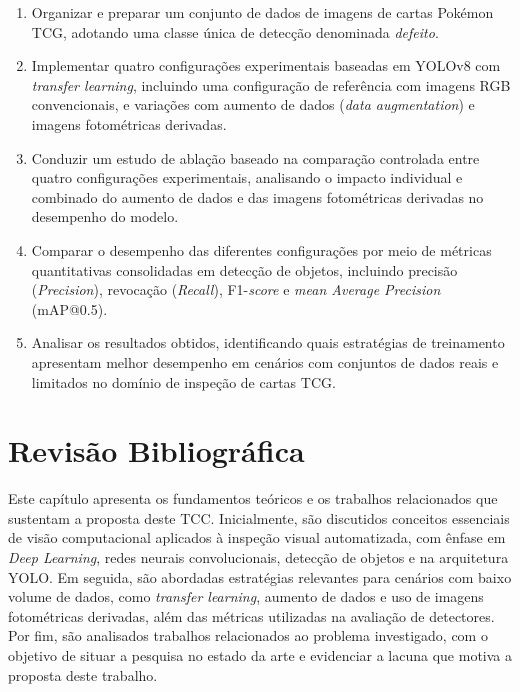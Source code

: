 \documentclass[
    12pt,                %
    openright,           %
    oneside,             %
    a4paper,             %
    english,             %
    brazil               %
]{abntex2}
\begin{document}
\begin{enumerate}
    \item Organizar e preparar um conjunto de dados de imagens de cartas 
    Pokémon TCG, adotando uma classe única de detecção denominada 
    \textit{defeito}.
    
    \item Implementar quatro configurações experimentais baseadas em YOLOv8 com
    \textit{transfer learning}, incluindo uma configuração de referência com imagens
    RGB convencionais, e variações com aumento de dados (\textit{data augmentation})
    e imagens fotométricas derivadas.

    \item Conduzir um estudo de ablação baseado na comparação controlada entre 
    quatro configurações experimentais, analisando o impacto individual e combinado 
    do aumento de dados e das imagens fotométricas derivadas no desempenho do modelo.

    \item Comparar o desempenho das diferentes configurações por meio 
    de métricas quantitativas consolidadas em detecção de objetos, 
    incluindo precisão (\textit{Precision}), revocação (\textit{Recall}), 
    F1-\textit{score} e \textit{mean Average Precision} (mAP@0.5).
    
    \item Analisar os resultados obtidos, identificando quais estratégias 
    de treinamento apresentam melhor desempenho em cenários com conjuntos 
    de dados reais e limitados no domínio de inspeção de cartas TCG.
\end{enumerate}

\chapter{Revisão Bibliográfica}
\label{cap:revisao}

Este capítulo apresenta os fundamentos teóricos e os trabalhos relacionados
que sustentam a proposta deste TCC. Inicialmente, são discutidos conceitos
essenciais de visão computacional aplicados à inspeção visual automatizada,
com ênfase em \textit{Deep Learning}, redes neurais convolucionais, detecção
de objetos e na arquitetura YOLO. Em seguida, são abordadas estratégias
relevantes para cenários com baixo volume de dados, como \textit{transfer learning},
aumento de dados e uso de imagens fotométricas derivadas, além das métricas utilizadas
na avaliação de detectores. Por fim, são analisados trabalhos relacionados ao
problema investigado, com o objetivo de situar a pesquisa no estado da arte e
evidenciar a lacuna que motiva a proposta deste trabalho.
\end{document}
